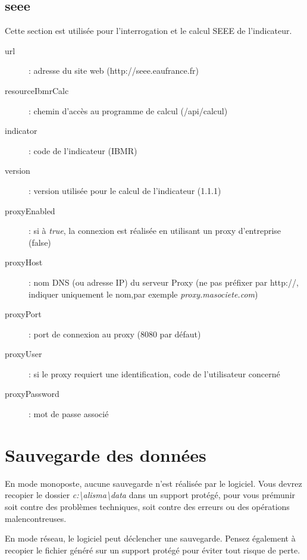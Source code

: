 \subsection{seee}
Cette section est utilisée pour l'interrogation et le calcul SEEE de l'indicateur.
\begin{description}
\item[url] : adresse du site web (http://seee.eaufrance.fr)
\item [resourceIbmrCalc] : chemin d'accès au programme de calcul (/api/calcul)
\item [indicator] : code de l'indicateur (IBMR)
\item [version] : version utilisée pour le calcul de l'indicateur (1.1.1)
\item [proxyEnabled] : si à \textit{true}, la connexion est réalisée en utilisant un proxy d'entreprise (false)
\item [proxyHost] : nom DNS (ou adresse IP) du serveur Proxy (ne pas préfixer par http://, indiquer uniquement le nom,par exemple \textit{proxy.masociete.com})
\item [proxyPort] : port de connexion au proxy (8080 par défaut)
\item [proxyUser] : si le proxy requiert une identification, code de l'utilisateur concerné
\item [proxyPassword] : mot de passe associé
\end{description}

\section{Sauvegarde des données}

En mode monoposte, aucune sauvegarde n'est réalisée par le logiciel. Vous devrez recopier le dossier \textit{\NoAutoSpaceBeforeFDP c:\textbackslash{}alisma\textbackslash{}data} dans un support protégé, pour vous prémunir soit contre des problèmes techniques, soit contre des erreurs ou des opérations malencontreuses.

En mode réseau, le logiciel peut déclencher une sauvegarde. Pensez également à recopier le fichier généré sur un support protégé pour éviter tout risque de perte.
